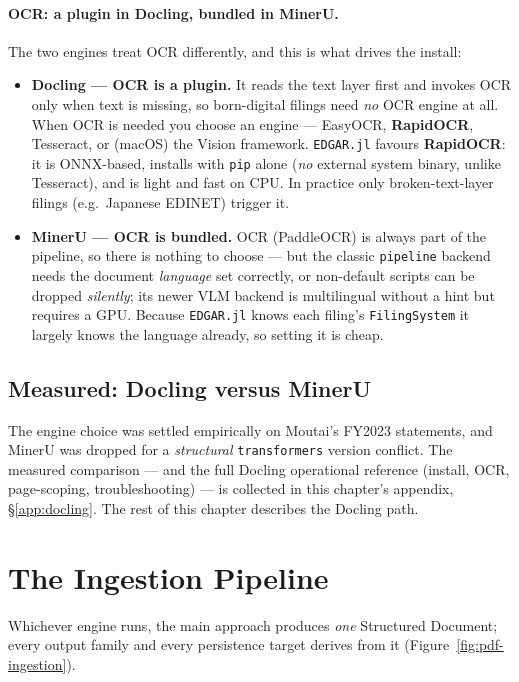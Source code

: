 \documentclass[11pt,a4paper]{report}
\begin{document}
\paragraph{OCR: a plugin in Docling, bundled in MinerU.} The two engines treat OCR differently, and this
is what drives the install:
\begin{itemize}
  \item \textbf{Docling --- OCR is a plugin.} It reads the text layer first and invokes OCR only when text
    is missing, so born-digital filings need \emph{no} OCR engine at all. When OCR is needed you choose an
    engine --- EasyOCR, \textbf{RapidOCR}, Tesseract, or (macOS) the Vision framework. \texttt{EDGAR.jl}
    favours \textbf{RapidOCR}: it is ONNX-based, installs with \texttt{pip} alone (\emph{no} external
    system binary, unlike Tesseract), and is light and fast on CPU. In practice only broken-text-layer
    filings (e.g.\ Japanese EDINET) trigger it.
  \item \textbf{MinerU --- OCR is bundled.} OCR (PaddleOCR) is always part of the pipeline, so there is
    nothing to choose --- but the classic \texttt{pipeline} backend needs the document \emph{language}
    set correctly, or non-default scripts can be dropped \emph{silently}; its newer VLM backend is
    multilingual without a hint but requires a GPU. Because \texttt{EDGAR.jl} knows each filing's
    \texttt{FilingSystem} it largely knows the language already, so setting it is cheap.
\end{itemize}

\subsection{Measured: Docling versus MinerU}

The engine choice was settled empirically on Moutai's FY2023 statements, and MinerU was dropped for a
\emph{structural} \texttt{transformers} version conflict. The measured comparison --- and the full Docling
operational reference (install, OCR, page-scoping, troubleshooting) --- is collected in this chapter's
appendix, \S\ref{app:docling}. The rest of this chapter describes the Docling path.

\section{The Ingestion Pipeline}\label{sec:pdf-pipeline}

Whichever engine runs, the main approach produces \emph{one} Structured Document; every output family and
every persistence target derives from it (Figure~\ref{fig:pdf-ingestion}).
\end{document}
